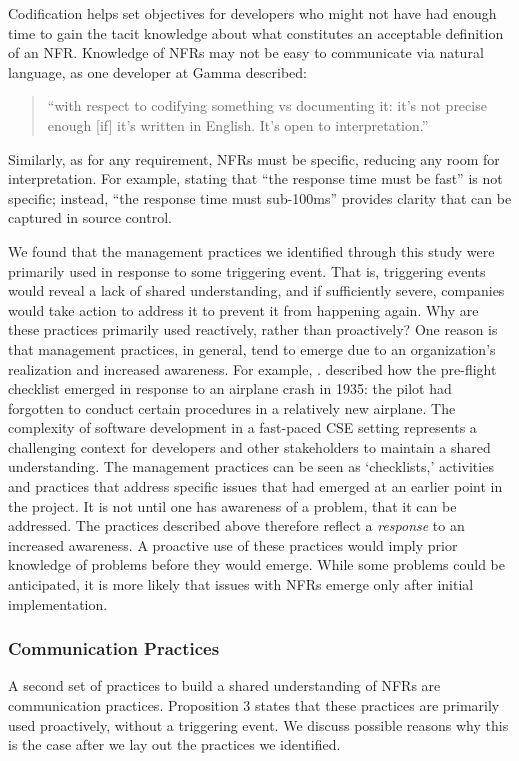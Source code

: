\documentclass[smallextended]{svjour3}        %
\begin{document}
Codification helps set objectives for developers who might not have had enough time to gain the tacit knowledge about what constitutes an acceptable definition of an NFR.
Knowledge of NFRs may not be easy to communicate via natural language, as one developer at Gamma described:
\begin{quote}
    ``with respect to codifying something vs documenting it: it's not precise enough [if] it's written in English. It's open to interpretation.''
\end{quote}
Similarly, as for any requirement, NFRs must be specific, reducing any room for interpretation. For example, stating that ``the response time must be fast'' is not specific; instead, ``the response time must sub-100ms'' provides clarity that can be captured in source control. 


We found that the management practices we identified through this study were primarily used in response to some triggering event. That is, triggering events would reveal a lack of shared understanding, and if sufficiently severe, companies would take action to address it to prevent it from happening again. 
Why are these practices primarily used reactively, rather than proactively? 
One reason is that management practices, in general, tend to emerge due to an organization's realization and increased awareness. For example, \citet[p. 33]{gawande2010checklist}. described how the pre-flight checklist emerged in response to an airplane crash in 1935: the pilot had forgotten to conduct certain procedures in a relatively new airplane. The complexity of software development in a fast-paced CSE setting represents a challenging context for developers and other stakeholders to maintain a shared understanding. The management practices can be seen as `checklists,' activities and practices that address specific issues that had emerged at an earlier point in the project.
It is not until one has awareness of a problem, that it can be addressed.  
The practices described above therefore reflect a \textit{response} to an increased awareness. A proactive use of these practices would imply prior knowledge of problems before they would emerge. While some problems could be anticipated, it is more likely that issues with NFRs emerge only after initial implementation.


\subsubsection{Communication Practices}
\label{sub:communication}
A second set of practices to build a shared understanding of NFRs are communication practices. Proposition 3 states that these practices are primarily used proactively, without a triggering event. We discuss possible reasons why this is the case after we lay out the practices we identified.
\end{document}
